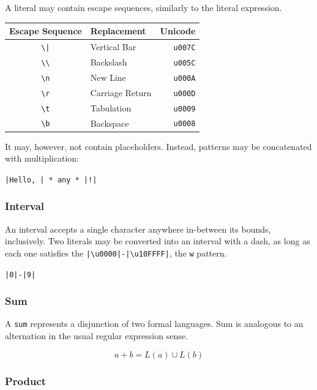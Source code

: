 \documentclass{article}
\begin{document}
A literal may contain escape sequences, similarly to the literal expression.

\begin{center}
\begin{tabular}{ c|l r }
    \hline
    Escape Sequence & Replacement & Unicode \\[1ex]
    \hline
    \verb/\|/ & Vertical Bar    & \texttt{u007C} \\ 
    \verb|\\| & Backslash       & \texttt{u005C} \\
    \verb|\n| & New Line        & \texttt{u000A} \\ 
    \verb|\r| & Carriage Return & \texttt{u000D} \\ 
    \verb|\t| & Tabulation      & \texttt{u0009} \\ 
    \verb|\b| & Backspace       & \texttt{u0008} \\
\end{tabular}
\end{center}

It may, however, not contain placeholders. Instead, patterns may be concatenated
with multiplication:

\begin{center}
    \verb/|Hello, | * any * |!|/
\end{center}

\subsubsection{Interval}

An interval accepts a single character anywhere in-between its bounds, inclusively.
Two literals may be converted into an interval with a dash, as long as each one
satisfies the \verb/|\u0000|-|\u10FFFF|/, the \verb|w| pattern.

\begin{center}
    \verb/|0|-|9|/
\end{center}

\subsubsection{Sum}

A \texttt{sum} represents a disjunction of two formal languages. Sum is analogous to
an alternation in the usual regular expression sense.

\[a + b = L\left(a\right) \cup L\left(b\right)\]

\subsubsection{Product}
\end{document}
